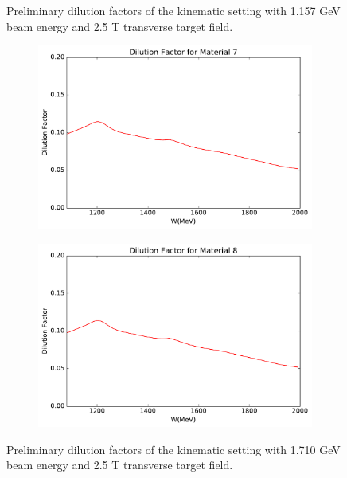 \begin{figure}[h!]
\begin{subfigure}[t]{0.49\textwidth}
  \end{subfigure}
  \caption[Dilution factors with $E=1.157$ GeV and $B=2.5$ T.]{Preliminary dilution factors of the kinematic setting with 1.157 GeV beam energy and 2.5 T transverse target field. \label{C7S4F1}}
\end{figure}

\begin{figure}[p!]
  \centering
  \begin{subfigure}[t]{0.49\textwidth}
    \includegraphics[width=\textwidth]{figs/dilution-17102590-7.pdf}
  \end{subfigure}
  \begin{subfigure}[t]{0.49\textwidth}
    \includegraphics[width=\textwidth]{figs/dilution-17102590-8.pdf}
  \end{subfigure}
  \caption[Dilution factors with $E=1.710$ GeV and $B=2.5$ T.]{Preliminary dilution factors of the kinematic setting with 1.710 GeV beam energy and 2.5 T transverse target field. \label{C7S4F2}}
\end{figure}

